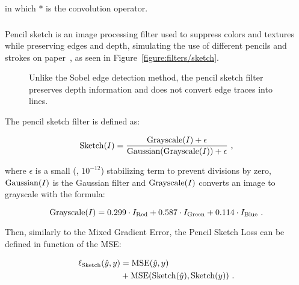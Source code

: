 \noindent in which $\ast$ is the convolution operator.

\subsubsection{}

Pencil sketch is an image processing filter used to suppress colors and textures while preserving edges and depth, simulating the use of different pencils and strokes on paper~\cite{galindo2019image}, as seen in Figure~\ref{figure:filters/sketch}.

\begin{figure}[bth]
  \centering
  \caption{Unlike the Sobel edge detection method, the pencil sketch filter preserves depth information and does not convert edge traces into lines.}
  \label{figure:filters/comparison}
\end{figure}

The pencil sketch filter is defined as:

\begin{equation}
    \label{equation:sketch}
    \Sketch(I) = \frac{\Grayscale(I) + \epsilon}{\Gaussian(\Grayscale(I)) + \epsilon}~\text{,}
\end{equation}

\noindent where $\epsilon$ is a small (\ie, $10^{-12}$) stabilizing term to prevent divisions by zero, $\operatorname{Gaussian}(I)$ is the Gaussian filter and $\operatorname{Grayscale}(I)$ converts an image to grayscale with the formula:

\begin{equation}
  \operatorname{Grayscale}(I) = 0.299 \cdot I_{\text{Red}} + 0.587 \cdot  I_{\text{Green}} + 0.114 \cdot I_{\text{Blue}}~\text{.}
\end{equation}

Then, similarly to the Mixed Gradient Error, the Pencil Sketch Loss can be defined in function of the MSE:

\begin{equation}
  \begin{aligned}
    \ell_{\text{Sketch}}(\hat{y}, y)
     & = \operatorname{MSE}(\hat{y}, y)                            \\
     & + \operatorname{MSE}(\operatorname{Sketch}(\hat{y}), \operatorname{Sketch}(y))~\text{.}
  \end{aligned}
\end{equation}


